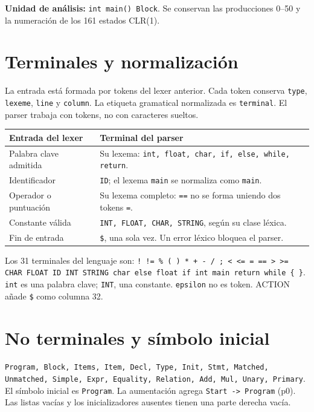 

\textbf{Unidad de análisis:} \texttt{int main() Block}. Se conservan las producciones 0--50 y la numeración de los 161 estados CLR(1).
\section*{Terminales y normalización}
La entrada está formada por tokens del lexer anterior. Cada token conserva \texttt{type}, \texttt{lexeme}, \texttt{line} y \texttt{column}. La etiqueta gramatical normalizada es \texttt{terminal}. El parser trabaja con tokens, no con caracteres sueltos.

\begin{tabularx}{\linewidth}{@{}p{4cm}X@{}}\toprule Entrada del lexer & Terminal del parser\\\midrule
Palabra clave admitida & Su lexema: \texttt{int, float, char, if, else, while, return}.\\
Identificador & \texttt{ID}; el lexema \texttt{main} se normaliza como \texttt{main}.\\
Operador o puntuación & Su lexema completo: \texttt{==} no se forma uniendo dos tokens \texttt{=}.\\
Constante válida & \texttt{INT, FLOAT, CHAR, STRING}, según su clase léxica.\\
Fin de entrada & \texttt{\$}, una sola vez. Un error léxico bloquea el parser.\\\bottomrule\end{tabularx}

Los 31 terminales del lenguaje son:
\texttt{! != \% ( ) * + - / ; \textless{} \textless{}= = == \textgreater{} \textgreater{}= CHAR FLOAT ID INT STRING char else float if int main return while \{ \}}.
\texttt{int} es una palabra clave; \texttt{INT}, una constante. \texttt{epsilon} no es token. ACTION añade \texttt{\$} como columna 32.
\section*{No terminales y símbolo inicial}
\texttt{Program, Block, Items, Item, Decl, Type, Init, Stmt, Matched, Unmatched, Simple, Expr, Equality, Relation, Add, Mul, Unary, Primary}.
El símbolo inicial es \texttt{Program}. La aumentación agrega \texttt{Start -> Program} (p0). Las listas vacías y los inicializadores ausentes tienen una parte derecha vacía.
